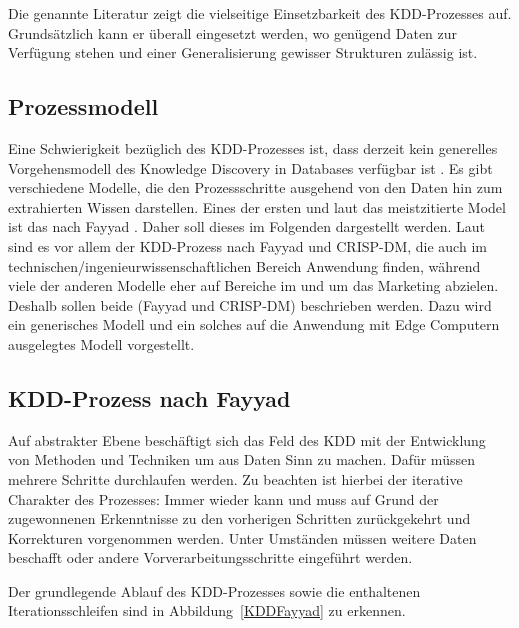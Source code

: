 Die genannte Literatur zeigt die vielseitige Einsetzbarkeit des KDD-Prozesses auf. Grundsätzlich kann er überall eingesetzt werden, wo genügend Daten zur Verfügung stehen und einer Generalisierung gewisser Strukturen zulässig ist. 


\subsection{Prozessmodell}

Eine Schwierigkeit bezüglich des KDD-Prozesses ist, dass \glqq derzeit kein generelles Vorgehensmodell des Knowledge Discovery in Databases verfügbar ist \grqq \cite{Dusing:2000}. Es gibt verschiedene Modelle, die den Prozessschritte ausgehend von den Daten hin zum extrahierten Wissen darstellen.  Eines der ersten und laut \cite{Kurgan:2006} das meistzitierte Model ist das nach  Fayyad \cite{Fayyad:1996}. Daher soll dieses im Folgenden dargestellt werden. Laut \cite{Kurgan:2006} sind es vor allem der KDD-Prozess nach Fayyad und CRISP-DM, die auch im  technischen/ingenieurwissenschaftlichen Bereich Anwendung finden, während viele der anderen Modelle eher auf Bereiche im und um das Marketing abzielen. Deshalb sollen beide (Fayyad und CRISP-DM) beschrieben werden.  Dazu wird ein generisches Modell und ein solches auf die Anwendung mit Edge Computern ausgelegtes Modell vorgestellt.

\subsection{KDD-Prozess nach Fayyad}
Auf abstrakter Ebene beschäftigt sich das Feld des KDD mit der Entwicklung von Methoden und Techniken um \glqq aus Daten Sinn zu machen\grqq \cite{Fayyad:1996}. Dafür müssen mehrere Schritte durchlaufen werden. Zu beachten ist hierbei der iterative Charakter des Prozesses: Immer wieder kann und muss auf Grund der zugewonnenen Erkenntnisse zu den vorherigen Schritten zurückgekehrt und Korrekturen vorgenommen werden. Unter Umständen müssen weitere Daten beschafft oder andere Vorverarbeitungsschritte eingeführt werden. \cite{Wrobel:1998}

Der grundlegende Ablauf des KDD-Prozesses sowie die enthaltenen Iterationsschleifen sind in Abbildung~\ref{KDDFayyad} zu erkennen.

